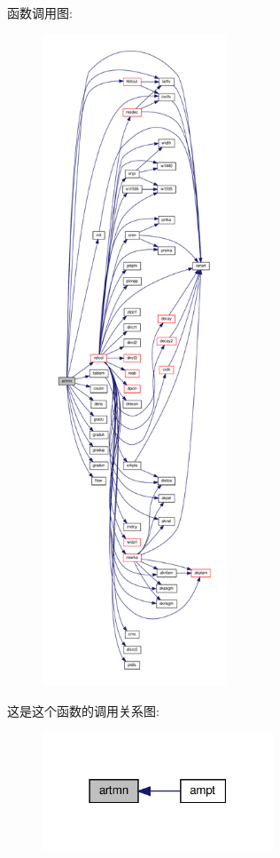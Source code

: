 函数调用图\+:
\nopagebreak
\begin{figure}[H]
\begin{center}
\leavevmode
\includegraphics[height=550pt]{artmn_8f90_ae64c0027dfd39be35dbd3eaeba1b5470_cgraph}
\end{center}
\end{figure}
这是这个函数的调用关系图\+:
\nopagebreak
\begin{figure}[H]
\begin{center}
\leavevmode
\includegraphics[width=195pt]{artmn_8f90_ae64c0027dfd39be35dbd3eaeba1b5470_icgraph}
\end{center}
\end{figure}
